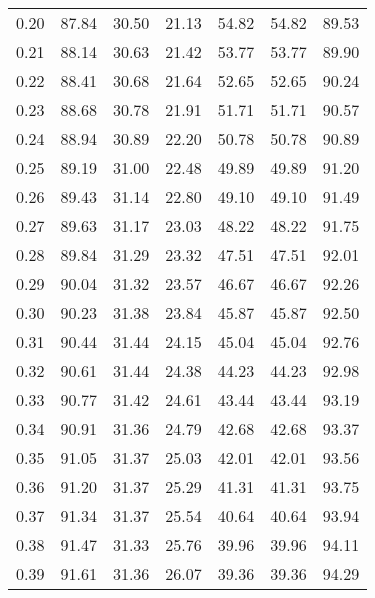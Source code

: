 \begin{tabular}{|c|c|c|c|c|c|c|}
      0.20 &     87.84 &     30.50 &      21.13 &   54.82 &      54.82 &         89.53 \\
      0.21 &     88.14 &     30.63 &      21.42 &   53.77 &      53.77 &         89.90 \\
      0.22 &     88.41 &     30.68 &      21.64 &   52.65 &      52.65 &         90.24 \\
      0.23 &     88.68 &     30.78 &      21.91 &   51.71 &      51.71 &         90.57 \\
      0.24 &     88.94 &     30.89 &      22.20 &   50.78 &      50.78 &         90.89 \\
      0.25 &     89.19 &     31.00 &      22.48 &   49.89 &      49.89 &         91.20 \\
      0.26 &     89.43 &     31.14 &      22.80 &   49.10 &      49.10 &         91.49 \\
      0.27 &     89.63 &     31.17 &      23.03 &   48.22 &      48.22 &         91.75 \\
      0.28 &     89.84 &     31.29 &      23.32 &   47.51 &      47.51 &         92.01 \\
      0.29 &     90.04 &     31.32 &      23.57 &   46.67 &      46.67 &         92.26 \\
      0.30 &     90.23 &     31.38 &      23.84 &   45.87 &      45.87 &         92.50 \\
      0.31 &     90.44 &     31.44 &      24.15 &   45.04 &      45.04 &         92.76 \\
      0.32 &     90.61 &     31.44 &      24.38 &   44.23 &      44.23 &         92.98 \\
      0.33 &     90.77 &     31.42 &      24.61 &   43.44 &      43.44 &         93.19 \\
      0.34 &     90.91 &     31.36 &      24.79 &   42.68 &      42.68 &         93.37 \\
      0.35 &     91.05 &     31.37 &      25.03 &   42.01 &      42.01 &         93.56 \\
      0.36 &     91.20 &     31.37 &      25.29 &   41.31 &      41.31 &         93.75 \\
      0.37 &     91.34 &     31.37 &      25.54 &   40.64 &      40.64 &         93.94 \\
      0.38 &     91.47 &     31.33 &      25.76 &   39.96 &      39.96 &         94.11 \\
      0.39 &     91.61 &     31.36 &      26.07 &   39.36 &      39.36 &         94.29 \\

\end{tabular}
